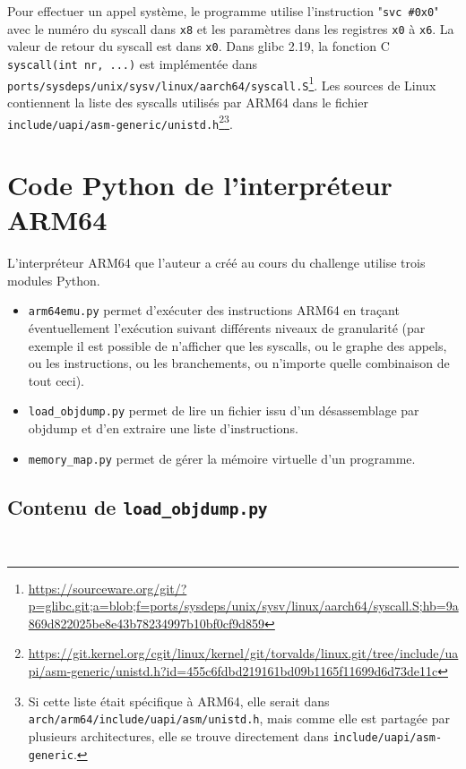 \documentclass[a4paper,10pt]{article}
\newcommand{\pyinput}[1]{%
    \noindent{\color[rgb]{0.5, 0.5, 0.5}{\rule{\textwidth}{0.4pt}}}
     \\
    \noindent{\color[rgb]{0.5, 0.5, 0.5}{\rule{\textwidth}{0.4pt}}}
}
\begin{document}
\begin{appendices}
Pour effectuer un appel système, le programme utilise l'instruction "\texttt{svc \#0x0}" avec le numéro du syscall dans \texttt{x8} et les paramètres dans les registres  \texttt{x0} à \texttt{x6}. La valeur de retour du syscall est dans \texttt{x0}. Dans glibc 2.19, la fonction C \texttt{syscall(int nr, ...)} est implémentée dans \texttt{ports/sysdeps/unix/sysv/linux/aarch64/syscall.S}\footnote{\url{https://sourceware.org/git/?p=glibc.git;a=blob;f=ports/sysdeps/unix/sysv/linux/aarch64/syscall.S;hb=9a869d822025be8e43b78234997b10bf0cf9d859}}.
Les sources de Linux contiennent la liste des syscalls utilisés par ARM64 dans le fichier \\
\texttt{include/uapi/asm-generic/unistd.h}\footnote{\url{https://git.kernel.org/cgit/linux/kernel/git/torvalds/linux.git/tree/include/uapi/asm-generic/unistd.h?id=455c6fdbd219161bd09b1165f11699d6d73de11c}}\footnote{Si cette liste était spécifique à ARM64, elle serait dans \texttt{arch/arm64/include/uapi/asm/unistd.h}, mais comme elle est partagée par plusieurs architectures, elle se trouve directement dans \texttt{include/uapi/asm-generic}.}.

\section{Code Python de l'interpréteur ARM64}

L'interpréteur ARM64 que l'auteur a créé au cours du challenge utilise trois modules Python.
\begin{itemize}
\item \texttt{arm64emu.py} permet d'exécuter des instructions ARM64 en traçant éventuellement l'exécution suivant différents niveaux de granularité (par exemple il est possible de n'afficher que les syscalls, ou le graphe des appels, ou les instructions, ou les branchements, ou n'importe quelle combinaison de tout ceci).
\item \texttt{load\_objdump.py} permet de lire un fichier issu d'un désassemblage par objdump et d'en extraire une liste d'instructions.
\item \texttt{memory\_map.py} permet de gérer la mémoire virtuelle d'un programme.
\end{itemize}

\subsection{Contenu de \texttt{load\_objdump.py}}

\pyinput{2_arm64/load_objdump.py.inc.tex}


\end{appendices}
\end{document}
